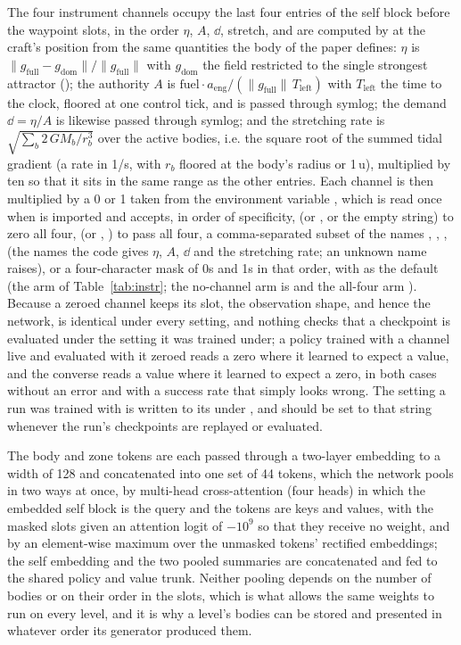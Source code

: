 The four instrument channels occupy the last four entries of the self block
before the waypoint slots, in the order $\eta$, $A$, $\dd$, stretch, and are
computed by  at the craft's position from the same
quantities the body of the paper defines: $\eta$ is
$\lVert g_{\mathrm{full}} - g_{\mathrm{dom}}\rVert / \lVert g_{\mathrm{full}}\rVert$
with $g_{\mathrm{dom}}$ the field restricted to the single strongest attractor
(); the authority $A$ is
$\mathrm{fuel}\cdot a_{\mathrm{eng}} / (\lVert g_{\mathrm{full}}\rVert\,T_{\mathrm{left}})$
with $T_{\mathrm{left}}$ the time to the clock, floored at one control tick,
and is passed through symlog; the demand $\dd = \eta/A$ is likewise passed
through symlog; and the stretching rate is
$\sqrt{\sum_b 2\,GM_b / r_b^3}$ over the active bodies, i.e. the square root
of the summed tidal gradient (a rate in 1/s, with $r_b$ floored at the body's
radius or 1\,u), multiplied by ten so that it sits in the same range as the
other entries. Each channel is then multiplied by a 0 or 1 taken from the
environment variable , which is read once when
 is imported and accepts, in order of specificity, 
(or , or the empty string) to zero all four,  (or ,
) to pass all four, a comma-separated subset of the names
, , ,  (the names the code
gives $\eta$, $A$, $\dd$ and the stretching rate; an unknown name raises), or a
four-character mask of 0s and 1s in that order, with  as the
default (the  arm of Table~\ref{tab:instr}; the no-channel
arm is  and the all-four arm ). Because a zeroed channel keeps
its slot, the observation shape, and hence the network, is identical under
every setting, and nothing checks that a checkpoint is evaluated under the
setting it was trained under; a policy trained with a channel live and
evaluated with it zeroed reads a zero where it learned to expect a value, and
the converse reads a value where it learned to expect a zero, in both cases
without an error and with a success rate that simply looks wrong. The setting
a run was trained with is written to its  under
, and  should be set to that
string whenever the run's checkpoints are replayed or evaluated.

The body and zone tokens are each passed through a two-layer embedding to a
width of 128 and concatenated into one set of 44 tokens, which the network
pools in two ways at once, by multi-head cross-attention (four heads) in which
the embedded self block is the query and the tokens are keys and values, with
the masked slots given an attention logit of $-10^9$ so that they receive no
weight, and by an element-wise maximum over the unmasked tokens' rectified
embeddings; the self embedding and the two pooled summaries are concatenated
and fed to the shared policy and value trunk. Neither pooling depends on the
number of bodies or on their order in the slots, which is what allows the same
weights to run on every level, and it is why a level's bodies can be stored
and presented in whatever order its generator produced them.
